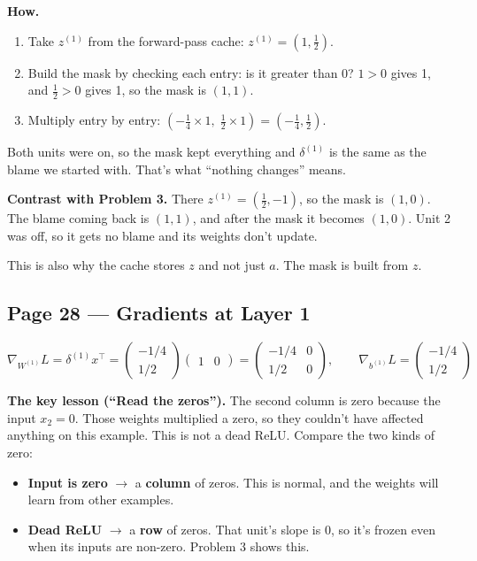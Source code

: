 \textbf{How.}
\begin{enumerate}[leftmargin=*]
  \item Take $z^{(1)}$ from the forward-pass cache: $z^{(1)} = (1, \tfrac12)$.
  \item Build the mask by checking each entry: is it greater than 0? $1>0$ gives 1, and $\tfrac12>0$ gives 1, so the mask is $(1,1)$.
  \item Multiply entry by entry: $(-\tfrac14 \times 1,\; \tfrac12 \times 1) = (-\tfrac14, \tfrac12)$.
\end{enumerate}
Both units were on, so the mask kept everything and $\delta^{(1)}$ is the same as the blame we started with. That's what ``nothing changes'' means.

\textbf{Contrast with Problem 3.} There $z^{(1)} = (\tfrac12, -1)$, so the mask is $(1, 0)$. The blame coming back is $(1,1)$, and after the mask it becomes $(1, 0)$. Unit 2 was off, so it gets no blame and its weights don't update.

This is also why the cache stores $z$ and not just $a$. The mask is built from $z$.

\subsection*{Page 28 --- Gradients at Layer 1}

\[
\nabla_{W^{(1)}} L = \delta^{(1)} x^{\top} = \begin{pmatrix} -1/4 \\ 1/2 \end{pmatrix} \begin{pmatrix} 1 & 0 \end{pmatrix} = \begin{pmatrix} -1/4 & 0 \\ 1/2 & 0 \end{pmatrix}, \qquad \nabla_{b^{(1)}} L = \begin{pmatrix} -1/4 \\ 1/2 \end{pmatrix}
\]

\textbf{The key lesson (``Read the zeros'').} The second column is zero because the input $x_2 = 0$. Those weights multiplied a zero, so they couldn't have affected anything on this example. This is not a dead ReLU. Compare the two kinds of zero:
\begin{itemize}[leftmargin=*]
  \item \textbf{Input is zero} $\to$ a \textbf{column} of zeros. This is normal, and the weights will learn from other examples.
  \item \textbf{Dead ReLU} $\to$ a \textbf{row} of zeros. That unit's slope is 0, so it's frozen even when its inputs are non-zero. Problem 3 shows this.
\end{itemize}

